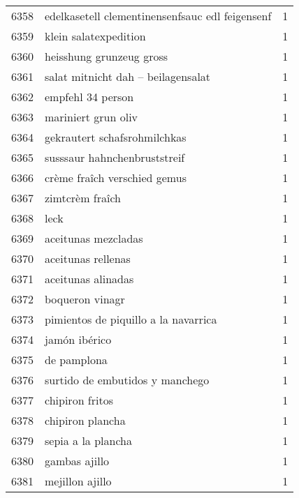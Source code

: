 \begin{tabular}{llr}
6358 &    edelkasetell clementinensenfsauc edl feigensenf &      1 \\
6359 &                              klein salatexpedition &      1 \\
6360 &                           heisshung grunzeug gross &      1 \\
6361 &                 salat mitnicht dah – beilagensalat &      1 \\
6362 &                                  empfehl 34 person &      1 \\
6363 &                                mariniert grun oliv &      1 \\
6364 &                       gekrautert schafsrohmilchkas &      1 \\
6365 &                       susssaur hahnchenbruststreif &      1 \\
6366 &                       crème fraîch verschied gemus &      1 \\
6367 &                                    zimtcrèm fraîch &      1 \\
6368 &                                               leck &      1 \\
6369 &                                aceitunas mezcladas &      1 \\
6370 &                                 aceitunas rellenas &      1 \\
6371 &                                 aceitunas alinadas &      1 \\
6372 &                                    boqueron vinagr &      1 \\
6373 &               pimientos de piquillo a la navarrica &      1 \\
6374 &                                      jamón ibérico &      1 \\
6375 &                                        de pamplona &      1 \\
6376 &                    surtido de embutidos y manchego &      1 \\
6377 &                                    chipiron fritos &      1 \\
6378 &                                   chipiron plancha &      1 \\
6379 &                                 sepia a la plancha &      1 \\
6380 &                                      gambas ajillo &      1 \\
6381 &                                    mejillon ajillo &      1 \\

\end{tabular}

